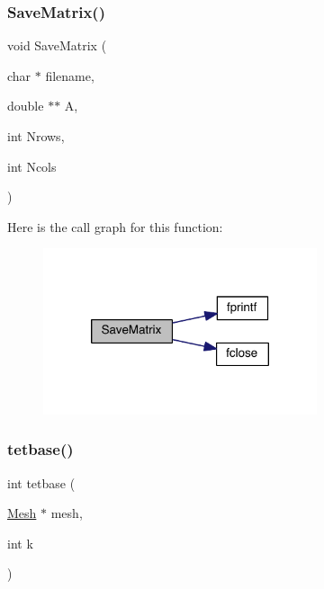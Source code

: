 \mbox{\label{a00602_ac376677d3caaa98a9daf61674a973d1b}} 
\subsubsection{\texorpdfstring{Save\+Matrix()}{SaveMatrix()}}
{\footnotesize\ttfamily void Save\+Matrix (\begin{DoxyParamCaption}\item[{char $\ast$}]{filename,  }\item[{double $\ast$$\ast$}]{A,  }\item[{int}]{Nrows,  }\item[{int}]{Ncols }\end{DoxyParamCaption})}

Here is the call graph for this function\+:\nopagebreak
\begin{figure}[H]
\begin{center}
\leavevmode
\includegraphics[width=228pt]{a00602_ac376677d3caaa98a9daf61674a973d1b_cgraph}
\end{center}
\end{figure}
\mbox{\label{a00602_aab0b0f793509896cdcfaa0b143acd8e8}} 
\subsubsection{\texorpdfstring{tetbase()}{tetbase()}}
{\footnotesize\ttfamily int tetbase (\begin{DoxyParamCaption}\item[{\hyperlink{a00557_aeffbe0891ab73a4d8964c9cb7978426e}{Mesh} $\ast$}]{mesh,  }\item[{int}]{k }\end{DoxyParamCaption})}

